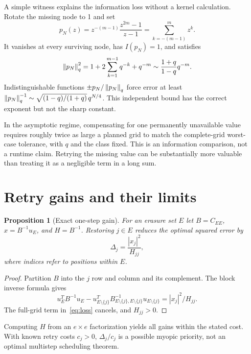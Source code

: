 \documentclass[11pt]{article}
\newtheorem{proposition}[theorem]{Proposition}
\begin{document}
A simple witness explains the information loss without a kernel calculation. Rotate the missing node to 1 and set
\begin{equation}
p_N(z)=z^{-(m-1)}\frac{z^{2m}-1}{z-1}
=\sum_{k=-(m-1)}^m z^k.
\label{eq:poly}
\end{equation}
It vanishes at every surviving node, has $I(p_N)=1$, and satisfies
\begin{equation}
\left\lVert p_N\right\rVert_q^2=1+2\sum_{k=1}^{m-1}q^{-k}+q^{-m}
\sim\frac{1+q}{1-q}q^{-m}.
\label{eq:polynorm}
\end{equation}
Indistinguishable functions $\pm p_N/\left\lVert p_N\right\rVert_q$ force error at least
$\left\lVert p_N\right\rVert_q^{-1}\sim\sqrt{(1-q)/(1+q)}\,q^{N/4}$. This independent bound has the correct exponent but not the sharp constant.

In the asymptotic regime, compensating for one permanently unavailable value requires roughly twice as large a planned grid to match the complete-grid worst-case tolerance, with $q$ and the class fixed. This is an information comparison, not a runtime claim. Retrying the missing value can be substantially more valuable than treating it as a negligible term in a long sum.

\section{Retry gains and their limits}
\begin{proposition}[Exact one-step gain]\label{prop:gain}
For an erasure set $E$ let $B=C_{EE}$, $x=B^{-1}u_E$, and $H=B^{-1}$. Restoring $j\in E$ reduces the optimal squared error by
\begin{equation}
\Delta_j=\frac{|x_j|^2}{H_{jj}},
\label{eq:gain}
\end{equation}
where indices refer to positions within $E$.
\end{proposition}
\begin{proof}
Partition $B$ into the $j$ row and column and its complement. The block inverse formula gives
\[
u_E^TB^{-1}u_E-u_{E\setminus\{j\}}^T
B_{E\setminus\{j\},E\setminus\{j\}}^{-1}u_{E\setminus\{j\}}
=|x_j|^2/H_{jj}.
\]
The full-grid term in~\eqref{eq:loss} cancels, and $H_{jj}>0$.
\end{proof}
Computing $H$ from an $e\times e$ factorization yields all gains within the stated cost. With known retry costs $c_j>0$, $\Delta_j/c_j$ is a possible myopic priority, not an optimal multistep scheduling theorem.
\end{document}
